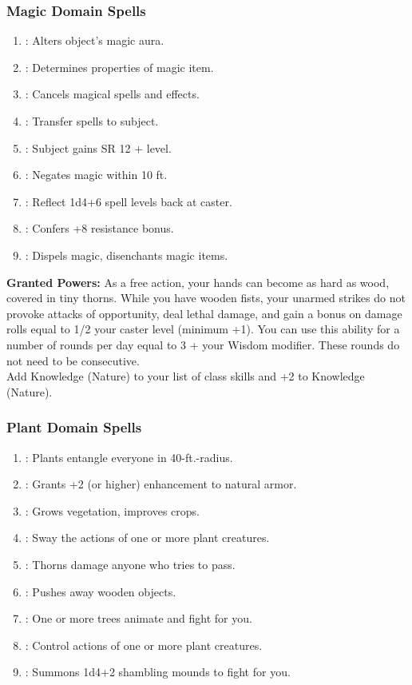 \subsubsection{Magic Domain Spells}
\begin{enumerate}
	\item{:} Alters object’s magic aura.
	\item{:} Determines properties of magic item.
	\item{:} Cancels magical spells and effects.
	\item{:} Transfer spells to subject.
	\item{:} Subject gains SR 12 + level.
	\item{:} Negates magic within 10 ft.
	\item{:} Reflect 1d4+6 spell levels back at caster.
	\item{:} Confers +8 resistance bonus.
	\item{:} Dispels magic, disenchants magic items.
\end{enumerate}

\textbf{Granted Powers:} As a free action, your hands can become as hard as wood, covered in tiny thorns. While you have wooden fists, your unarmed strikes do not provoke attacks of opportunity, deal lethal damage, and gain a bonus on damage rolls equal to 1/2 your caster level (minimum +1). You can use this ability for a number of rounds per day equal to 3 + your Wisdom modifier. These rounds do not need to be consecutive.
\\Add Knowledge (Nature) to your list of class skills and +2 to Knowledge (Nature).
\subsubsection{Plant Domain Spells}
\begin{enumerate}
	\item{:} Plants entangle everyone in 40-ft.-radius.
	\item{:} Grants +2 (or higher) enhancement to natural armor.
	\item{:} Grows vegetation, improves crops.
	\item{:} Sway the actions of one or more plant creatures.
	\item{:} Thorns damage anyone who tries to pass.
	\item{:} Pushes away wooden objects.
	\item{:} One or more trees animate and fight for you.
	\item{:} Control actions of one or more plant creatures.
	\item{:} Summons 1d4+2 shambling mounds to fight for you.
\end{enumerate}

